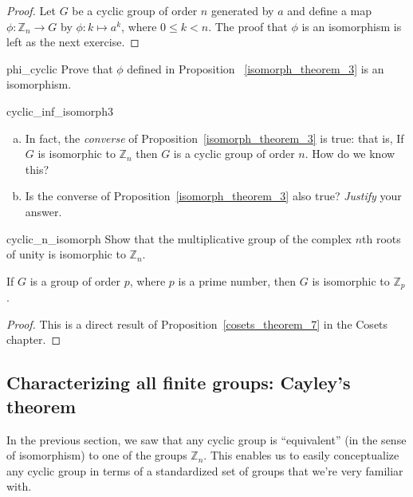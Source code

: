 \begin{proof}
Let $G$ be a cyclic group of order $n$ generated by $a$ and define a map $\phi : {\mathbb Z}_n \rightarrow  G$ by $\phi : k \mapsto a^k$, where $0 \leq k < n$. The proof that $\phi$ is an isomorphism is left as the next exercise. 
\end{proof}

\begin{exercise}{phi_cyclic}
Prove that $\phi$ defined in Proposition ~\ref{isomorph_theorem_3} is an isomorphism.
\end{exercise}

\begin{exercise}{cyclic_inf_isomorph3}
\begin{enumerate}[(a)]
\item
In fact, the \emph{converse} of Proposition~\ref{isomorph_theorem_3} is true: that is,   If $G$ is isomorphic to ${\mathbb Z_n}$
then $G$ is a  cyclic group of order $n$.  How do we know this?
\item
Is the converse of Proposition~\ref{isomorph_theorem_3} also true?  \emph{Justify} your answer.
\end{enumerate}
\end{exercise}


\begin{exercise}{cyclic_n_isomorph}
Show that the multiplicative group of the complex $n$th roots of unity is isomorphic to ${\mathbb Z}_n$.
\end{exercise} 

\begin{thm}\label{isomorph_theorem_4}
If $G$ is a  group of order $p$, where $p$ is a prime number, then $G$ is isomorphic to ${\mathbb Z}_p$. 
\end{thm}

\begin{proof}
This  is a direct result of Proposition~\ref{cosets_theorem_7} in the Cosets chapter.
\end{proof}
 

\subsection{Characterizing all finite groups: Cayley's theorem}
 
In the previous section, we saw that any cyclic group is ``equivalent'' (in the sense of isomorphism) to one of the groups $\mathbb{Z}_n$.  This enables us to easily conceptualize any cyclic group in terms of a standardized set of  groups that we're very familiar with. 

